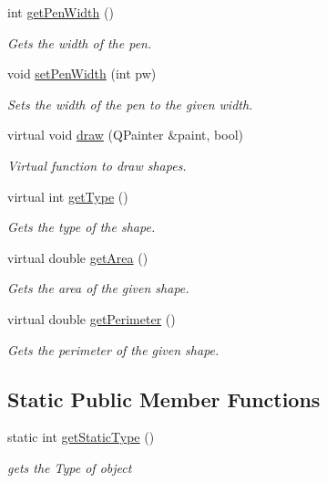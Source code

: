 \begin{DoxyCompactItemize}
int \hyperlink{classEllipse_a8d3e931715310a529b6690d3dc711181}{get\+Pen\+Width} ()
\begin{DoxyCompactList}\small\item\em Gets the width of the pen. \end{DoxyCompactList}\item 
void \hyperlink{classEllipse_ad36ab08a7eddb0df1709e89fbeda0831}{set\+Pen\+Width} (int pw)
\begin{DoxyCompactList}\small\item\em Sets the width of the pen to the given width. \end{DoxyCompactList}\item 
virtual void \hyperlink{classEllipse_a807da0badc3cc332ba408e6d94333a36}{draw} (Q\+Painter \&paint, bool)
\begin{DoxyCompactList}\small\item\em Virtual function to draw shapes. \end{DoxyCompactList}\item 
virtual int \hyperlink{classEllipse_af8a6e2834d811a632d323cc3d9cb5b31}{get\+Type} ()
\begin{DoxyCompactList}\small\item\em Gets the type of the shape. \end{DoxyCompactList}\item 
virtual double \hyperlink{classEllipse_aa9aff42aee3c6188e017dfa9d6a0590a}{get\+Area} ()
\begin{DoxyCompactList}\small\item\em Gets the area of the given shape. \end{DoxyCompactList}\item 
virtual double \hyperlink{classEllipse_afc43182b486fb25e7ba9fd344cfee5d4}{get\+Perimeter} ()
\begin{DoxyCompactList}\small\item\em Gets the perimeter of the given shape. \end{DoxyCompactList}\end{DoxyCompactItemize}
\subsection*{Static Public Member Functions}
\begin{DoxyCompactItemize}
\item 
static int \hyperlink{classEllipse_a05cf0c6c09a47baaaed6c2d0df922dfb}{get\+Static\+Type} ()
\begin{DoxyCompactList}\small\item\em gets the Type of object \end{DoxyCompactList}\end{DoxyCompactItemize}


